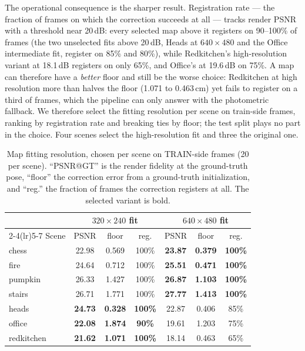\documentclass[journal]{IEEEtran}
\begin{document}
The operational consequence is the sharper result. Registration rate --- the
fraction of frames on which the correction succeeds at all --- tracks render
PSNR with a threshold near 20\,dB: every selected map above it registers on 90--100\% of frames (the two unselected fits above 20\,dB, Heads at $640{\times}480$ and the Office intermediate fit, register on 85\% and 80\%), while Redkitchen's high-resolution variant at 18.1\,dB registers on
only 65\%, and Office's at 19.6\,dB on 75\%. A map can therefore have a
\emph{better} floor and still be the worse choice: Redkitchen at high
resolution more than halves the floor (1.071 to 0.463\,cm) yet fails to
register on a third of frames, which the pipeline can only answer with the
photometric fallback. We therefore select the fitting resolution per scene on
train-side frames, ranking by registration rate and breaking ties by floor;
the test split plays no part in the choice. Four scenes select the
high-resolution fit and three the original one.

\begin{table}[t]
\caption{Map fitting resolution, chosen per scene on TRAIN-side frames (20
per scene). ``PSNR@GT'' is the render fidelity at the ground-truth pose,
``floor'' the correction error from a ground-truth initialization, and
``reg.'' the fraction of frames the correction registers at all. The
selected variant is bold.}
\label{tab:maprestab}
\centering\scriptsize
\setlength{\tabcolsep}{3.5pt}
\begin{tabular}{@{}lcccccc@{}}
\toprule
& \multicolumn{3}{c}{$320{\times}240$ fit} & \multicolumn{3}{c}{$640{\times}480$ fit} \\
\cmidrule(lr){2-4}\cmidrule(lr){5-7}
Scene & PSNR & floor & reg. & PSNR & floor & reg. \\
\midrule
chess      & 22.98 & 0.569 & 100\% & \textbf{23.87} & \textbf{0.379} & \textbf{100\%} \\
fire       & 24.64 & 0.712 & 100\% & \textbf{25.51} & \textbf{0.471} & \textbf{100\%} \\
pumpkin    & 26.33 & 1.427 & 100\% & \textbf{26.87} & \textbf{1.103} & \textbf{100\%} \\
stairs     & 26.71 & 1.771 & 100\% & \textbf{27.77} & \textbf{1.413} & \textbf{100\%} \\
\midrule
heads      & \textbf{24.73} & \textbf{0.328} & \textbf{100\%} & 22.87 & 0.406 & 85\% \\
office     & \textbf{22.08} & \textbf{1.874} & \textbf{90\%}  & 19.61 & 1.203 & 75\% \\
redkitchen & \textbf{21.62} & \textbf{1.071} & \textbf{100\%} & 18.14 & 0.463 & 65\% \\
\bottomrule
\end{tabular}
\end{table}
\end{document}
